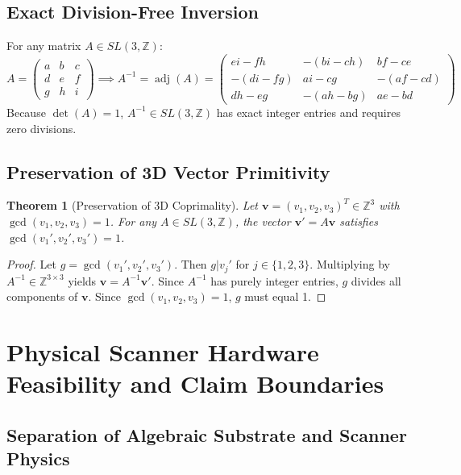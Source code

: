 \documentclass{article}
\newtheorem{theorem}{Theorem}
\theoremstyle{remark}
\begin{document}
\subsection{Exact Division-Free Inversion}

For any matrix $A \in SL(3,\mathbb{Z})$:
\[
A = \begin{pmatrix} a & b & c \\ d & e & f \\ g & h & i \end{pmatrix} \implies A^{-1} = \operatorname{adj}(A) = \begin{pmatrix} ei - fh & -(bi - ch) & bf - ce \\ -(di - fg) & ai - cg & -(af - cd) \\ dh - eg & -(ah - bg) & ae - bd \end{pmatrix}
\]
Because $\det(A) = 1$, $A^{-1} \in SL(3,\mathbb{Z})$ has exact integer entries and requires zero divisions.

\subsection{Preservation of 3D Vector Primitivity}

\begin{theorem}[Preservation of 3D Coprimality]
Let $\mathbf{v} = (v_1, v_2, v_3)^T \in \mathbb{Z}^3$ with $\gcd(v_1, v_2, v_3) = 1$. For any $A \in SL(3,\mathbb{Z})$, the vector $\mathbf{v}' = A\mathbf{v}$ satisfies $\gcd(v_1', v_2', v_3') = 1$.
\end{theorem}
\begin{proof}
Let $g = \gcd(v_1', v_2', v_3')$. Then $g | v_j'$ for $j \in \{1, 2, 3\}$. Multiplying by $A^{-1} \in \mathbb{Z}^{3 \times 3}$ yields $\mathbf{v} = A^{-1}\mathbf{v}'$. Since $A^{-1}$ has purely integer entries, $g$ divides all components of $\mathbf{v}$. Since $\gcd(v_1, v_2, v_3) = 1$, $g$ must equal 1.
\end{proof}

\section{Physical Scanner Hardware Feasibility and Claim Boundaries}

\subsection{Separation of Algebraic Substrate and Scanner Physics}
\end{document}
